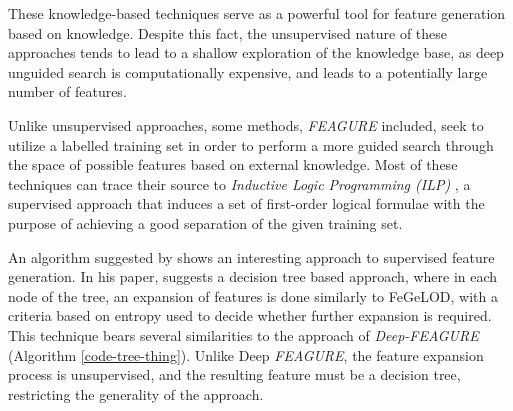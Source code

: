 \documentclass{article}
\theoremstyle{definition}
\begin{document}
These knowledge-based techniques serve as a powerful tool for feature generation based on knowledge. Despite this fact, the unsupervised nature of these approaches tends to lead to a shallow exploration of the knowledge base, as deep unguided search is computationally expensive, and leads to a potentially large number of features. %

Unlike unsupervised approaches, some methods, \emph{FEAGURE} included, seek to utilize a labelled training set in order to perform a more guided search through the space of possible features based on external knowledge. 
Most of these techniques can trace their source to \emph{Inductive Logic Programming (ILP)} \citep{quinlan1990learning}, a supervised approach that induces a set of first-order logical formulae with the purpose of achieving a good separation of the given training set. 

An algorithm suggested by \cite{terziev2011feature} shows an interesting approach to supervised feature generation. In his paper, \cite{terziev2011feature} suggests a decision tree based approach, where in each node of the tree, an expansion of features is done similarly to FeGeLOD, with a criteria based on entropy used to decide whether further expansion is required. This technique bears several similarities to the approach of \emph{Deep-FEAGURE} (Algorithm \ref{code-tree-thing}). Unlike Deep \emph{FEAGURE}, the feature expansion process is unsupervised, and the resulting feature must be a decision tree, restricting the generality of the approach.
\end{document}
